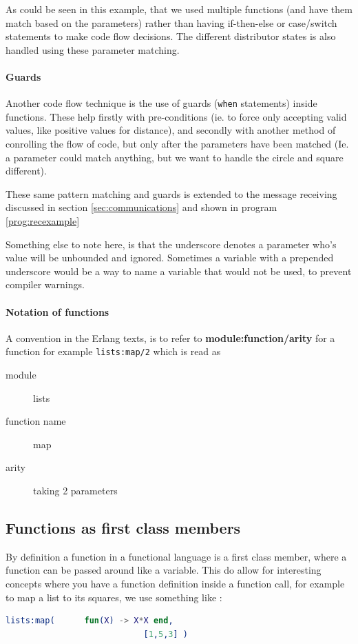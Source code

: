 \documentclass[a4paper,11pt]{report}
\begin{document}
As could be seen in this example, that we used multiple functions (and
have them match based on the parameters) rather than having
if-then-else or case/switch statements to make code flow
decisions. The different distributor states is also handled using
these parameter matching.

\paragraph{Guards} 
\label{par:guards}Another code flow technique is the use of guards
(\texttt{when} statements) inside functions. These help firstly with
pre-conditions (ie. to force only accepting valid values, like
positive values for distance), and secondly with another method of
conrolling the flow of code, but only after the parameters have been
matched (Ie. a parameter could match anything, but we want to handle
the circle and square different).

These same pattern matching and guards is extended to the message
receiving discussed in section \ref{sec:communications} and shown in
program \ref{prog:recexample}

Something else to note here, is that the underscore denotes a
parameter who's value will be unbounded and ignored. Sometimes a
variable with a prepended underscore would be a way to name a
variable that would not be used, to prevent compiler warnings.

\paragraph{Notation of functions}

A convention in the Erlang texts, is to refer to
\textbf{module:function/arity} for a function for example
\texttt{lists:map/2} which is read as
\begin{description}
\item[module] lists
\item[function name] map
\item[arity] taking 2 parameters
\end{description}

\subsection{Functions as first class members}
\label{sec:func1st}
By definition a function in a functional language is a first class
member, where a function can be passed around like a variable. This do
allow for interesting concepts where you have a function definition
inside a function call, for example to map a list to its squares, we
use something like :
\begin{lstlisting}[language=erlang]
lists:map(		fun(X) -> X*X end,
							[1,5,3] )
\end{lstlisting}
\end{document}
